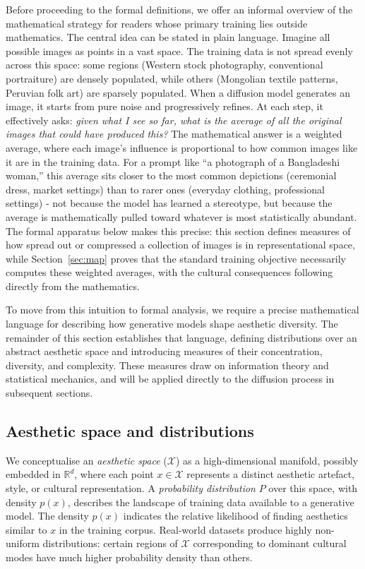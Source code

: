 \documentclass[11pt]{article}
\begin{document}
Before proceeding to the formal definitions, we offer an informal overview of the mathematical strategy for readers whose primary training lies outside mathematics. The central idea can be stated in plain language. Imagine all possible images as points in a vast space. The training data is not spread evenly across this space: some regions (Western stock photography, conventional portraiture) are densely populated, while others (Mongolian textile patterns, Peruvian folk art) are sparsely populated. When a diffusion model generates an image, it starts from pure noise and progressively refines. At each step, it effectively asks: \textit{given what I see so far, what is the average of all the original images that could have produced this?} The mathematical answer is a weighted average, where each image's influence is proportional to how common images like it are in the training data. For a prompt like ``a photograph of a Bangladeshi woman,'' this average sits closer to the most common depictions (ceremonial dress, market settings) than to rarer ones (everyday clothing, professional settings) - not because the model has learned a stereotype, but because the average is mathematically pulled toward whatever is most statistically abundant. The formal apparatus below makes this precise: this section defines measures of how spread out or compressed a collection of images is in representational space, while Section~\ref{sec:map} proves that the standard training objective necessarily computes these weighted averages, with the cultural consequences following directly from the mathematics.

To move from this intuition to formal analysis, we require a precise mathematical language for describing how generative models shape aesthetic diversity. The remainder of this section establishes that language, defining distributions over an abstract aesthetic space and introducing measures of their concentration, diversity, and complexity. These measures draw on information theory and statistical mechanics, and will be applied directly to the diffusion process in subsequent sections.

\subsection{Aesthetic space and distributions}

We conceptualise an \textit{aesthetic space} ($\mathcal{X}$) as a high-dimensional manifold, possibly embedded in $\mathbb{R}^d$, where each point $x \in \mathcal{X}$ represents a distinct aesthetic artefact, style, or cultural representation. A \textit{probability distribution} $P$ over this space, with density $p(x)$, describes the landscape of training data available to a generative model. The density $p(x)$ indicates the relative likelihood of finding aesthetics similar to $x$ in the training corpus. Real-world datasets produce highly non-uniform distributions: certain regions of $\mathcal{X}$ corresponding to dominant cultural modes have much higher probability density than others.
\end{document}
